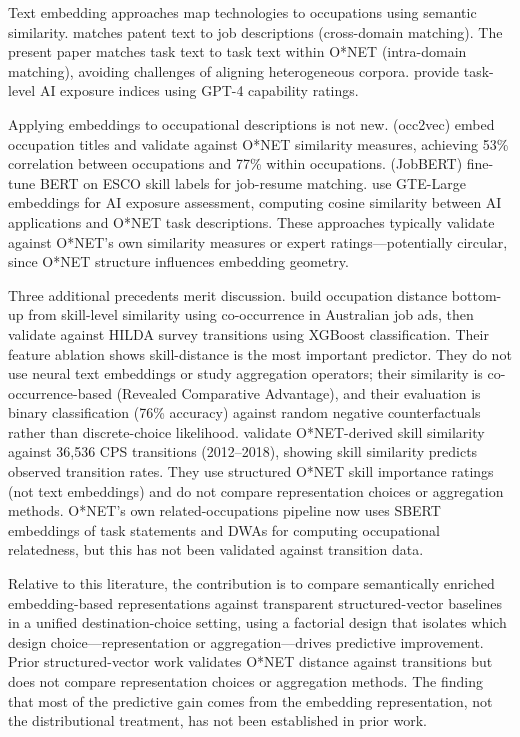\documentclass[12pt]{article}
\begin{document}
Text embedding approaches map technologies to occupations using semantic similarity. \citet{Webb2020} matches patent text to job descriptions (cross-domain matching). The present paper matches task text to task text within O*NET (intra-domain matching), avoiding challenges of aligning heterogeneous corpora. \citet{EloundouEtAl2024} provide task-level AI exposure indices using GPT-4 capability ratings.

Applying embeddings to occupational descriptions is not new. \citet{ZhangEtAl2021} (occ2vec) embed occupation titles and validate against O*NET similarity measures, achieving 53\% correlation between occupations and 77\% within occupations. \citet{DecorteEtAl2022} (JobBERT) fine-tune BERT on ESCO skill labels for job-resume matching. \citet{HampoleEtAl2025} use GTE-Large embeddings for AI exposure assessment, computing cosine similarity between AI applications and O*NET task descriptions. These approaches typically validate against O*NET's own similarity measures or expert ratings---potentially circular, since O*NET structure influences embedding geometry.

Three additional precedents merit discussion. \citet{dawson2021skill} build occupation distance bottom-up from skill-level similarity using co-occurrence in Australian job ads, then validate against HILDA survey transitions using XGBoost classification. Their feature ablation shows skill-distance is the most important predictor. They do not use neural text embeddings or study aggregation operators; their similarity is co-occurrence-based (Revealed Comparative Advantage), and their evaluation is binary classification (76\% accuracy) against random negative counterfactuals rather than discrete-choice likelihood. \citet{frank2024network} validate O*NET-derived skill similarity against 36,536 CPS transitions (2012--2018), showing skill similarity predicts observed transition rates. They use structured O*NET skill importance ratings (not text embeddings) and do not compare representation choices or aggregation methods. O*NET's own related-occupations pipeline \citep{onet2024related} now uses SBERT embeddings of task statements and DWAs for computing occupational relatedness, but this has not been validated against transition data.

Relative to this literature, the contribution is to compare semantically enriched embedding-based representations against transparent structured-vector baselines in a unified destination-choice setting, using a factorial design that isolates which design choice---representation or aggregation---drives predictive improvement. Prior structured-vector work \citep{MouwEtAl2024,SchuStanTaska2024} validates O*NET distance against transitions but does not compare representation choices or aggregation methods. The finding that most of the predictive gain comes from the embedding representation, not the distributional treatment, has not been established in prior work.
\end{document}

